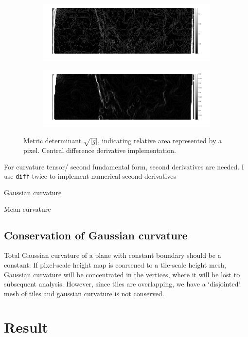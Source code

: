 \documentclass[10pt,a4paper]{article}
\begin{document}
\begin{figure}
\begin{subfigure}{\textwidth}
\centering
\includegraphics[width=\textwidth]{435_sqrtg.png}
\end{subfigure}
\begin{subfigure}{\textwidth}
\includegraphics[width=\textwidth]{435_sqrtg_smooth5.png}
\end{subfigure}
\caption{Metric determinant $\sqrt{|g|}$, indicating relative area represented by a pixel.  Central difference derivative implementation.}
\end{figure}

For curvature tensor/ second fundamental form, second derivatives are needed.  I use \texttt{diff} twice to implement numerical second derivatives

Gaussian curvature

Mean curvature
\subsection{Conservation of Gaussian curvature}
Total Gaussian curvature of a plane with constant boundary should be a constant.  If pixel-scale height map is coarsened to a tile-scale height mesh, Gaussian curvature will be concentrated in the vertices, where it will be lost to subsequent analysis.  However, since tiles are overlapping, we have a `disjointed' mesh of tiles and gaussian curvature is not conserved.
\section{Result}
\end{document}

